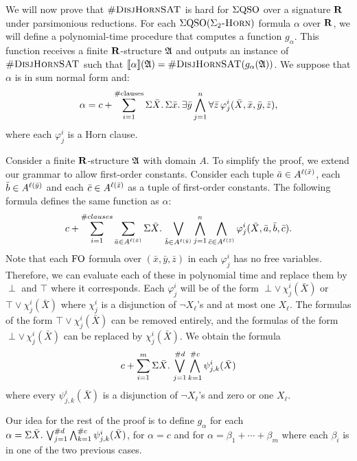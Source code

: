 \vspace{1em}
We will now prove that $\textsc{\#DisjHornSAT}$ is hard for $\Sigma{\rm QSO}$ over a signature $\mathbf{R}$ under parsimonious reductions. For each $\Sigma{\rm QSO}(\Sigma_2\textsc{-Horn})$ formula $\alpha$ over $\mathbf{R}$, we will define a polynomial-time procedure that computes a function $g_{\alpha}$. This function receives a finite $\mathbf{R}$-structure $\mathfrak{A}$ and outputs an instance of $\textsc{\#DisjHornSAT}$ such that ${\llbracket{}{\alpha}\rrbracket}(\mathfrak{A}) = \textsc{\#DisjHornSAT}(g_{\alpha}(\mathfrak{A}))$. We suppose that $\alpha$ is in sum normal form and:
$$
\alpha = c + \sum_{i = 1}^{\text{\#clauses}} \Sigma{\bar{X}}.\,\Sigma{\bar{x}}.\,\exists\bar{y}\bigwedge_{j = 1}^{n}\forall\bar{z}\,\varphi^i_j(\bar{X},\bar{x},\bar{y},\bar{z}),
$$
where each $\varphi^i_j$ is a Horn clause.                                                                

Consider a finite $\mathbf{R}$-structure $\mathfrak{A}$ with domain $A$. To simplify the proof, we extend our grammar to allow first-order constants. Consider each tuple $\bar{a}\in A^{\ell(\bar{x})}$, each $\bar{b}\in A^{\ell(\bar{y})}$ and each $\bar{c}\in A^{\ell(\bar{z})}$ as a tuple of first-order constants. The following formula defines the same function as $\alpha$:
$$
c + \sum_{i = 1}^{\#clauses} \sum_{\bar{a}\in A^{\ell(\bar{x})}} \Sigma{\bar{X}}.\,\bigvee_{\bar{b}\in A^{\ell(\bar{y})}}\bigwedge_{j = 1}^{n}\bigwedge_{\bar{c}\in A^{\ell(\bar{z})}}\varphi^i_j(\bar{X},\bar{a},\bar{b},\bar{c}).
$$
Note that each ${\rm FO}$ formula over $(\bar{x},\bar{y},\bar{z})$ in each $\varphi^i_j$ has no free variables. Therefore, we can evaluate each of these in polynomial time and replace them by $\perp$ and $\top$ where it corresponds. Each $\varphi^i_j$ will be of the form $\perp \vee\, \chi^i_j(\bar{X})$ or $\top \vee \chi^i_j(\bar{X})$ where $\chi^i_j$ is a disjunction of $\neg X_{\ell}$'s and at most one $X_{\ell}$. The formulas of the form $\top \vee \chi^i_j(\bar{X})$ can be removed entirely, and the formulas of the form $\perp \vee\, \chi^i_j(\bar{X})$ can be replaced by $\chi^i_j(\bar{X})$. We obtain the formula
$$
c + \sum_{i = 1}^{m}\Sigma{\bar{X}}.\,\bigvee_{j = 1}^{\#d}\bigwedge_{k = 1}^{\#c}\psi^{i}_{j,k}(\bar{X})
$$
where every $\psi^{i}_{j,k}(\bar{X})$ is a disjunction of $\neg X_{\ell}$'s and zero or one $X_{\ell}$.

Our idea for the rest of the proof is to define $g_{\alpha}$ for each $\alpha = \Sigma{\bar{X}}.\,\bigvee_{j = 1}^{\#d}\bigwedge_{k = 1}^{\#c}\psi^{i}_{j,k}(\bar{X})$, for $\alpha = c$ and for $\alpha = \beta_1 + \cdots + \beta_m$ where each $\beta_i$ is in one of the two previous cases.

